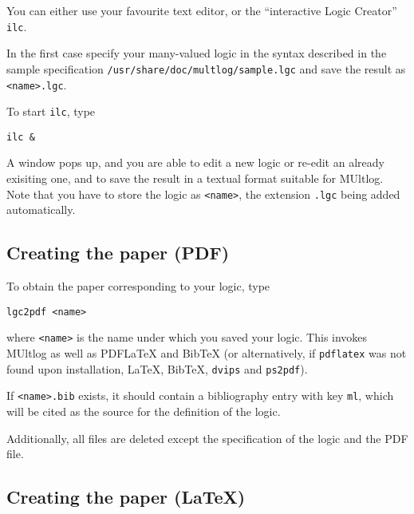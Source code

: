 \documentclass[
]{article}
\newcommand{\passthrough}[1]{#1}
\begin{document}
You can either use your favourite text editor, or the ``interactive
Logic Creator'' \passthrough{\lstinline!ilc!}.

In the first case specify your many-valued logic in the syntax described
in the sample specification
\passthrough{\lstinline!/usr/share/doc/multlog/sample.lgc!} and save the
result as \passthrough{\lstinline!<name>.lgc!}.

To start \passthrough{\lstinline!ilc!}, type

\begin{lstlisting}
ilc &
\end{lstlisting}

A window pops up, and you are able to edit a new logic or re-edit an
already exisiting one, and to save the result in a textual format
suitable for MUltlog. Note that you have to store the logic as
\passthrough{\lstinline!<name>!}, the extension
\passthrough{\lstinline!.lgc!} being added automatically.

\hypertarget{creating-the-paper-pdf}{%
\subsection{Creating the paper (PDF)}\label{creating-the-paper-pdf}}

To obtain the paper corresponding to your logic, type

\begin{lstlisting}
lgc2pdf <name>
\end{lstlisting}

where \passthrough{\lstinline!<name>!} is the name under which you saved
your logic. This invokes MUltlog as well as PDFLaTeX and BibTeX (or
alternatively, if \passthrough{\lstinline!pdflatex!} was not found upon
installation, LaTeX, BibTeX, \passthrough{\lstinline!dvips!} and
\passthrough{\lstinline!ps2pdf!}).

If \passthrough{\lstinline!<name>.bib!} exists, it should contain a
bibliography entry with key \passthrough{\lstinline!ml!}, which will be
cited as the source for the definition of the logic.

Additionally, all files are deleted except the specification of the
logic and the PDF file.

\hypertarget{creating-the-paper-latex}{%
\subsection{Creating the paper (LaTeX)}\label{creating-the-paper-latex}}
\end{document}
